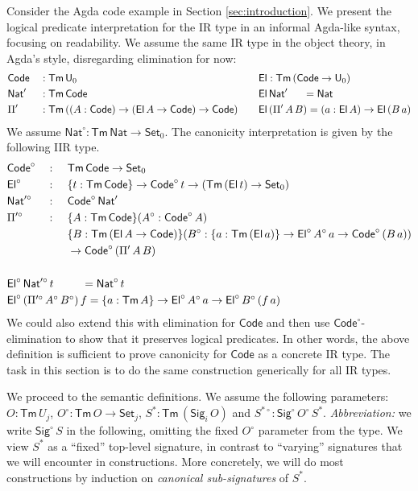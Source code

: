 \documentclass[acmsmall,screen,review,anonymous]{acmart}
\newcommand{\msf}[1]{{\mathsf{#1}}}
\newcommand{\U}{\msf{U}}
\newcommand{\Set}{\msf{Set}}
\newcommand{\Nat}{\msf{Nat}}
\newcommand{\El}{\msf{El}}
\newcommand{\Sig}{\msf{Sig}}
\newcommand{\Code}{\msf{Code}}
\newcommand{\Tm}{\msf{Tm}}
\newcommand{\w}{\circ}
\begin{document}
\begin{example}\label{ex:code-canonicity}
Consider the Agda code example in Section \ref{sec:introduction}. We present the logical predicate interpretation for the
IR type in an informal Agda-like syntax, focusing on readability. We assume the same IR type in the object
theory, in Agda's style, disregarding elimination for now:
\begin{alignat*}{4}
  &\Code &&: \Tm\,\U_0 && \El : \Tm\,(\Code \to \U_0) \\
  &\Nat' &&: \Tm\,\Code && \El\,\Nat'\hspace{1.5em} = \Nat \\
  &\Pi'  &&: \Tm\,((A : \Code) \to (\El\,A \to \Code) \to \Code)\hspace{1em} && \El\,(\Pi'\,A\,B) = (a : \El\,A) \to \El\,(B\,a)
\end{alignat*}
We assume $\Nat^\w : \Tm\,\Nat \to \Set_0$. The canonicity interpretation is given by the following IIR type.
\begin{alignat*}{4}
  &\Code^\w &&: \,\,&& \Tm\,\Code \to \Set_0\quad\\
  &\El^\w   &&: \,\,&& \{t : \Tm\,\Code\} \to \Code^\w\,t \to (\Tm\,(\El\,t) \to \Set_0)\\
  &\Nat'^\w &&: \,\,&& \Code^\w\,\Nat'\\
  &\Pi'^\w  &&: \,\,&&\{A : \Tm\,\Code\}(A^\w : \Code^\w\,A)\\
  &         &&  && \{B : \Tm\,(\El\,A \to \Code)\}(B^\w : \{a : \Tm\,(\El\,a)\} \to \El^\w\,A^\w\,a \to \Code^\w\,(B\,a))\\
  &         &&  && \to \Code^\w\,(\Pi'\,A\,B)\\
  &\rlap{}\\
  &\rlap{$\El^\w\,\Nat'^\w\,t \hspace{2.55em}= \Nat^\w\,t$}  \\
  &\rlap{$\El^\w\,(\Pi'^\w\,A^\w\,B^\w)\,f = \{a : \Tm\,A\} \to \El^\w\,A^\w\,a \to \El^\w\,B^\w\,(f\,a)$}
\end{alignat*}
We could also extend this with elimination for $\Code$ and then use $\Code^\w$-elimination to show
that it preserves logical predicates. In other words, the above definition is sufficient to prove canonicity
for $\Code$ as a concrete IR type. The task in this section is to do the same construction generically
for all IR types.
\end{example}

We proceed to the semantic definitions. We assume the following parameters: $O : \Tm\,U_j$, $O^\w :
\Tm\,O \to \Set_j$, $S^* : \Tm\,(\Sig_i\,O)$ and $S^{*\w} :
\Sig^\w\,O^\w\,S^*$. \emph{Abbreviation:} we write $\Sig^\w\,S$ in the following, omitting the fixed
$O^\w$ parameter from the type.  We view $S^*$ as a ``fixed'' top-level signature, in contrast to
``varying'' signatures that we will encounter in constructions. More concretely, we will do most
constructions by induction on \emph{canonical sub-signatures} of $S^*$.
\end{document}
